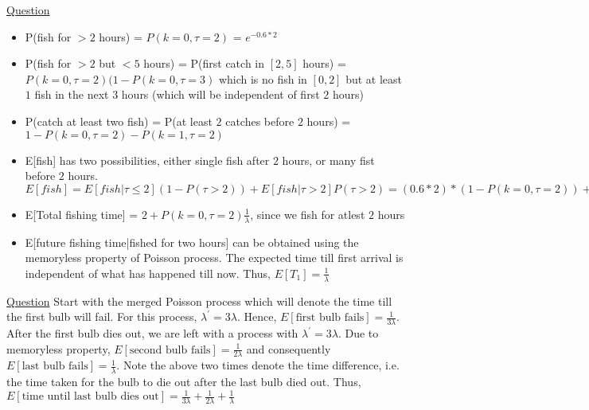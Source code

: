 \documentclass[../probability-notes.tex]{subfiles}
\begin{document}
\begin{enumerate}
        \hypertarget{a_poissonfish}{\item} \hyperlink{q_poissonfish}{Question}
        \begin{itemize}
            \item P(fish for $> 2$ hours) = $P(k=0, \tau=2)$ = $e^{-0.6 * 2}$
            \item P(fish for $> 2$ but $< 5$ hours) = P(first catch in $[2,5]$ hours) = $P(k=0,\tau=2)(1-P(k=0,\tau=3)$ which is no fish in $[0,2]$ but at least $1$ fish in the next $3$ hours (which will be independent of first $2$ hours)
            \item P(catch at least two fish) = P(at least $2$ catches before $2$ hours) = $1 - P(k=0,\tau=2) - P(k=1,\tau=2)$
            \item E[fish] has two possibilities, either single fish after $2$ hours, or many fist before $2$ hours. $E[fish] = E[fish|\tau \leq 2](1-P(\tau > 2)) + E[fish|\tau > 2] P(\tau > 2) = (0.6*2)*(1-P(k=0,\tau=2)) + 1*P(k=0,\tau=2)$
            \item E[Total fishing time] = $2 + P(k=0,\tau=2)\frac{1}{\lambda}$, since we fish for atlest $2$ hours
            \item E[future fishing time|fished for two hours] can be obtained using the memoryless property of Poisson process. The expected time till first arrival is independent of what has happened till now. Thus, $E[T_{1}] = \frac{1}{\lambda}$
        \end{itemize}

        \hypertarget{a_poissonbulb}{\item} \hyperlink{q_poissonbulb}{Question}\newline
        Start with the merged Poisson process which will denote the time till the first bulb will fail. For this process, $\lambda^{'} = 3\lambda$. Hence, $E[\text{first bulb fails}] = \frac{1}{3\lambda}$.
        After the first bulb dies out, we are left with a process with $\lambda^{'} = 3\lambda$. Due to memoryless property, $E[\text{second bulb fails}] = \frac{1}{2\lambda}$ and consequently $E[\text{last bulb fails}] = \frac{1}{\lambda}$. \newline
        Note the above two times denote the time difference, i.e. the time taken for the bulb to die out after the last bulb died out. Thus, $E[\text{time until last bulb dies out}] = \frac{1}{3\lambda} + \frac{1}{2\lambda} + \frac{1}{\lambda}$


\end{enumerate}
\end{document}
